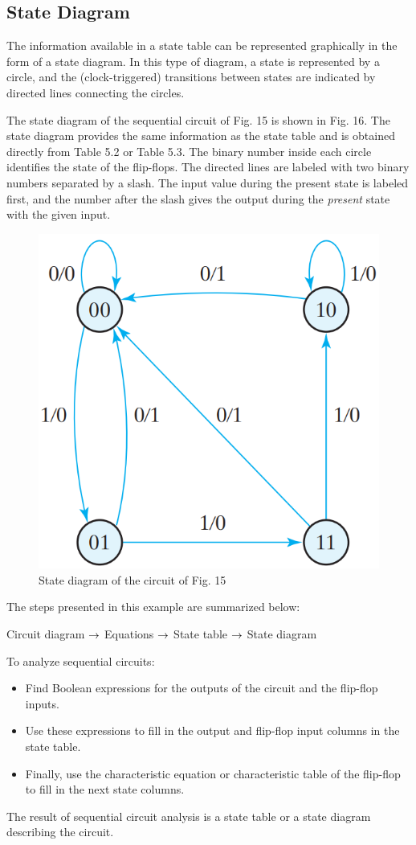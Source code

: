 \subsection{State Diagram}
\label{subsec:state-diagram}

The information available in a state table can be represented graphically in the form of a state diagram. In this type of diagram, a state is represented by a circle, and the (clock-triggered) transitions between states are indicated by directed lines connecting the circles.

The state diagram of the sequential circuit of Fig. 15 is shown in Fig. 16. The state diagram provides the same information as the state table and is obtained directly from Table 5.2 or Table 5.3. The binary number inside each circle identifies the state of the flip-flops. The directed lines are labeled with two binary numbers separated by a slash. The input value during the present state is labeled first, and the number after the slash gives the output during the \textit{present} state with the given input.
\begin{figure}[H]
  \centering
  \includegraphics[width=.5\linewidth]{img/fig-5.16.png}
  \caption{State diagram of the circuit of Fig. 15}
  \label{fig:5.16}
\end{figure}

The steps presented in this example are summarized below:
\begin{center}
  Circuit diagram $\rightarrow$ Equations $\rightarrow$ State table $\rightarrow$ State diagram
\end{center}

To analyze sequential circuits:
\begin{itemize}
  \item Find Boolean expressions for the outputs of the circuit and the flip-flop inputs.
  \item Use these expressions to fill in the output and flip-flop input columns in the state table.
  \item Finally, use the characteristic equation or characteristic table of the flip-flop to fill in the next state columns.
\end{itemize}
The result of sequential circuit analysis is a state table or a state diagram describing the circuit.

